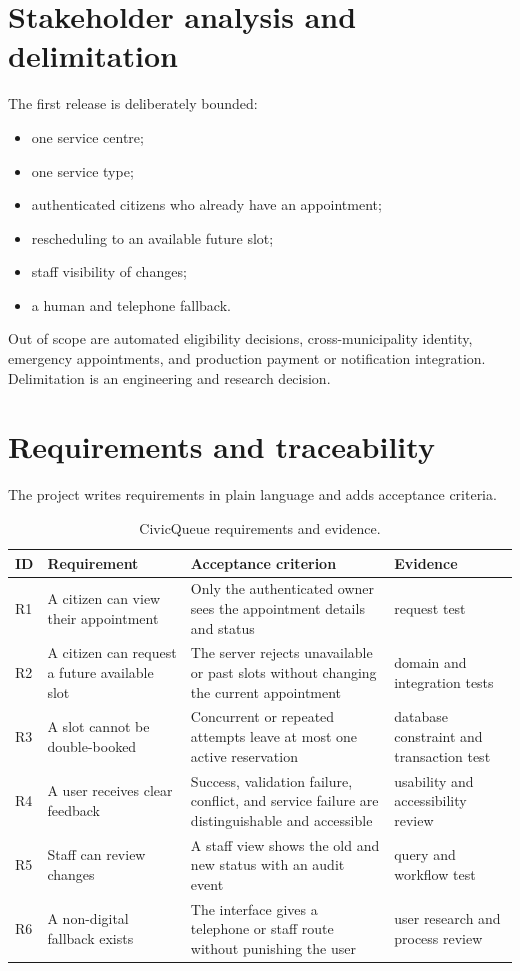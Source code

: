 \section{Stakeholder analysis and delimitation}
The first release is deliberately bounded:
\begin{itemize}
\item one service centre;
\item one service type;
\item authenticated citizens who already have an appointment;
\item rescheduling to an available future slot;
\item staff visibility of changes;
\item a human and telephone fallback.
\end{itemize}
Out of scope are automated eligibility decisions, cross-municipality identity, emergency appointments, and production payment or notification integration. Delimitation is an engineering and research decision.

\section{Requirements and traceability}
The project writes requirements in plain language and adds acceptance criteria.

\begin{longtable}{p{}p{}p{}p{}}
\caption{CivicQueue requirements and evidence.}\\
\toprule
ID & Requirement & Acceptance criterion & Evidence\\
\midrule
R1 & A citizen can view their appointment & Only the authenticated owner sees the appointment details and status & request test\\
R2 & A citizen can request a future available slot & The server rejects unavailable or past slots without changing the current appointment & domain and integration tests\\
R3 & A slot cannot be double-booked & Concurrent or repeated attempts leave at most one active reservation & database constraint and transaction test\\
R4 & A user receives clear feedback & Success, validation failure, conflict, and service failure are distinguishable and accessible & usability and accessibility review\\
R5 & Staff can review changes & A staff view shows the old and new status with an audit event & query and workflow test\\
R6 & A non-digital fallback exists & The interface gives a telephone or staff route without punishing the user & user research and process review\\
\bottomrule
\end{longtable}

